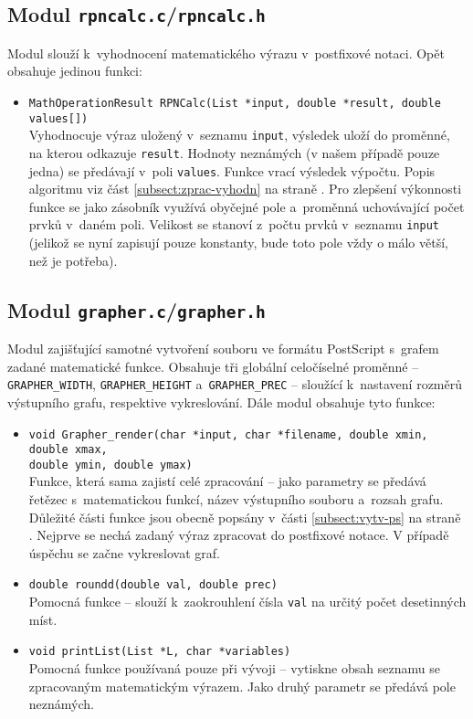 \documentclass[pdftex,a4paper]{article}
\begin{document}
\newpage
\subsection{Modul \texttt{rpncalc.c}/\texttt{rpncalc.h}}
Modul slouží k~vyhodnocení matematického výrazu v~postfixové notaci. Opět obsahuje jedinou funkci:

\begin{itemize}
\item \texttt{MathOperationResult RPNCalc(List *input, double *result, double values[])} \\
	  Vyhodnocuje výraz uložený v~seznamu \texttt{input}, výsledek uloží do proměnné, na kterou odkazuje \texttt{result}. Hodnoty neznámých (v našem případě pouze jedna) se předávají v~poli \texttt{values}. Funkce vrací výsledek výpočtu. Popis algoritmu viz část \ref{subsect:zprac-vyhodn} na straně \pageref{subsect:zprac-vyhodn}. Pro zlepšení výkonnosti funkce se jako zásobník využívá obyčejné pole a~proměnná uchovávající počet prvků v~daném poli. Velikost se stanoví z~počtu prvků v~seznamu \texttt{input} (jelikož se nyní zapisují pouze konstanty, bude toto pole vždy o málo větší, než je potřeba).
 
\end{itemize}


\subsection{Modul \texttt{grapher.c}/\texttt{grapher.h}}
Modul zajišťující samotné vytvoření souboru ve formátu \textsf{PostScript} s~grafem zadané matematické funkce. Obsahuje tři globální celočíselné proměnné -- \texttt{GRAPHER\_WIDTH}, \texttt{GRAPHER\_HEIGHT} a~\texttt{GRAPHER\_PREC} -- sloužící k~nastavení rozměrů výstupního grafu, respektive  vykreslování. Dále modul obsahuje tyto funkce:

\begin{itemize}
\item \texttt{void Grapher\_render(char *input, char *filename, double xmin, double xmax,\\double ymin, double ymax)} \\
	  Funkce, která sama zajistí celé zpracování -- jako parametry se předává řetězec s~matematickou funkcí, název výstupního souboru a~rozsah grafu. Důležité části funkce jsou obecně popsány v~části \ref{subsect:vytv-ps} na straně \pageref{subsect:vytv-ps}. Nejprve se nechá zadaný výraz zpracovat do postfixové notace. V případě úspěchu se začne vykreslovat graf.
	  
\item \texttt{double roundd(double val, double prec)} \\
	  Pomocná funkce -- slouží k~zaokrouhlení čísla \texttt{val} na určitý počet desetinných míst. 
	  	  
\item \texttt{void printList(List *L, char *variables)} \\
	  Pomocná funkce používaná pouze při vývoji -- vytiskne obsah seznamu se zpracovaným matematickým výrazem. Jako druhý parametr se předává pole neznámých.
	  
\end{itemize}
\end{document}
